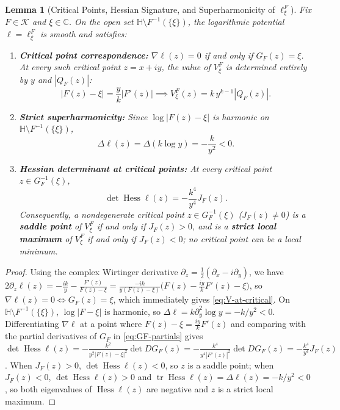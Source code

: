 \documentclass[12pt]{article}
\def\C{\mathbb{C}}
\def\H{\mathbb{H}}
\def\K{\mathcal{K}}
\newtheorem{lemma}[thm]{Lemma}
\theoremstyle{definition}
\numberwithin{equation}{section}
\begin{document}
\begin{lemma}[Critical Points, Hessian Signature, and Superharmonicity of $\ell_\xi^F$]\label{lem:hessian}
Fix $F \in \K$ and $\xi \in \C$. On the open set $\H \setminus F^{-1}(\{\xi\})$, the logarithmic potential $\ell = \ell_\xi^F$ is smooth and satisfies:
\begin{enumerate}
  \item \textbf{Critical point correspondence:} $\nabla \ell(z) = 0$ if and only if $G_F(z) = \xi$. At every such critical point $z = x+iy$, the value of $V_\xi^F$ is determined entirely by $y$ and $|Q_F(z)|$:
  \begin{equation}\label{eq:V-at-critical}
    |F(z) - \xi| = \frac{y}{k} |F'(z)| \implies V_\xi^F(z) = k \, y^{k-1} |Q_F(z)|.
  \end{equation}
  \item \textbf{Strict superharmonicity:} Since $\log |F(z)-\xi|$ is harmonic on $\H \setminus F^{-1}(\{\xi\})$,
  \begin{equation}\label{eq:ell-laplacian}
    \Delta \ell(z) = \Delta(k \log y) = -\frac{k}{y^2} < 0.
  \end{equation}
  \item \textbf{Hessian determinant at critical points:} At every critical point $z \in G_F^{-1}(\xi)$,
  \begin{equation}\label{eq:hessian-det}
    \det \operatorname{Hess}\ell(z) = -\frac{k^4}{y^4} J_F(z).
  \end{equation}
  Consequently, a nondegenerate critical point $z \in G_F^{-1}(\xi)$ ($J_F(z) \ne 0$) is a \textbf{saddle point} of $V_\xi^F$ if and only if $J_F(z) > 0$, and is a \textbf{strict local maximum} of $V_\xi^F$ if and only if $J_F(z) < 0$; no critical point can be a local minimum.
\end{enumerate}
\end{lemma}

\begin{proof}
Using the complex Wirtinger derivative $\partial_z = \frac{1}{2}(\partial_x - i\partial_y)$, we have $2\partial_z \ell(z) = -\frac{ik}{y} - \frac{F'(z)}{F(z)-\xi} = \frac{-ik}{y(F(z)-\xi)}\big(F(z) - \frac{iy}{k}F'(z) - \xi\big)$, so $\nabla \ell(z) = 0 \iff G_F(z) = \xi$, which immediately gives \eqref{eq:V-at-critical}. On $\H \setminus F^{-1}(\{\xi\})$, $\log|F-\xi|$ is harmonic, so $\Delta \ell = k \partial_y^2 \log y = -k/y^2 < 0$. Differentiating $\nabla \ell$ at a point where $F(z) - \xi = \frac{iy}{k}F'(z)$ and comparing with the partial derivatives of $G_F$ in \eqref{eq:GF-partials} gives $\det \operatorname{Hess}\ell(z) = -\frac{k^2}{y^2 |F(z)-\xi|^2} \det DG_F(z) = -\frac{k^4}{y^4 |F'(z)|^2}\det DG_F(z) = -\frac{k^4}{y^4} J_F(z)$. When $J_F(z) > 0$, $\det\operatorname{Hess}\ell(z) < 0$, so $z$ is a saddle point; when $J_F(z) < 0$, $\det\operatorname{Hess}\ell(z) > 0$ and $\operatorname{tr}\operatorname{Hess}\ell(z) = \Delta \ell(z) = -k/y^2 < 0$, so both eigenvalues of $\operatorname{Hess}\ell(z)$ are negative and $z$ is a strict local maximum.
\end{proof}
\end{document}
